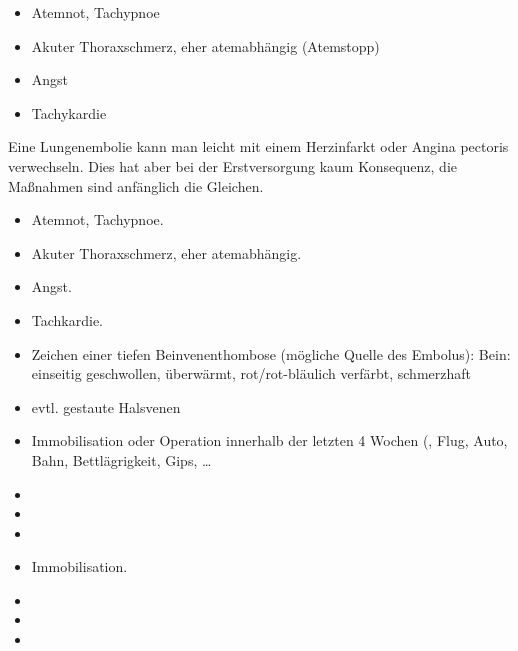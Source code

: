 {%
\begin{itemize}
  \item Atemnot, Tachypnoe
  \item Akuter Thoraxschmerz, eher atemabhängig (Atemstopp)
  \item Angst
  \item Tachykardie
\end{itemize}

Eine Lungenembolie kann man leicht mit einem Herzinfarkt oder Angina
pectoris verwechseln. Dies hat aber bei der Erstversorgung kaum
Konsequenz, die Maßnahmen sind anfänglich die Gleichen.


}{
\begin{itemize}
  \item Atemnot, Tachypnoe.
  \item Akuter Thoraxschmerz, eher atemabhängig.
  \item Angst.
  \item Tachkardie.
\end{itemize}
}{}{}{}


{%
\begin{itemize}
  \item Zeichen einer tiefen Beinvenenthombose (mögliche
  Quelle des Embolus): Bein: einseitig geschwollen,
  überwärmt, rot/rot-bläulich verfärbt, schmerzhaft
  \item evtl. gestaute Halsvenen
\end{itemize}
}{

}{}{}{}


{%
\begin{itemize}
  \item Immobilisation oder Operation innerhalb
  der letzten 4 Wochen (, Flug, Auto,
  Bahn, Bettlägrigkeit, Gips, {\dots}
  \item {}
  \item {}
  \item {}
\end{itemize}
}{
\begin{itemize}
  \item Immobilisation.
  \item {}
  \item {}
  \item {}
\end{itemize}
}{}{}{}



